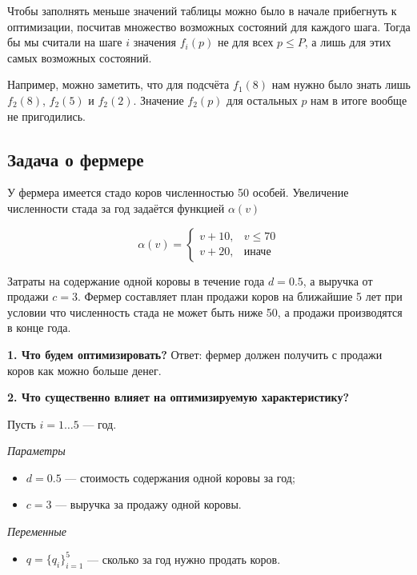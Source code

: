 \remark

Чтобы заполнять меньше значений таблицы можно было в начале прибегнуть к оптимизации, посчитав множество возможных состояний для каждого шага. Тогда бы мы считали на шаге $i$ значения $f_i(p)$ не для всех $p \le P$, а лишь для этих самых возможных состояний.

Например, можно заметить, что для подсчёта $f_1(8)$ нам нужно было знать лишь $f_2(8)$, $f_2(5)$ и $f_2(2)$. Значение $f_2(p)$ для остальных $p$ нам в итоге вообще не пригодились.

\subsection{Задача о фермере}

У фермера имеется стадо коров численностью 50 особей. Увеличение численности стада за год задаётся функцией $\alpha(v)$

\[
\alpha(v) = \begin{cases}
	v + 10,& v \le 70 \\
	v + 20,& \text{иначе}
\end{cases}
\]

Затраты на содержание одной коровы в течение года $d = 0.5$, а выручка от продажи $c = 3$. Фермер составляет план продажи коров на ближайшие 5 лет при условии что численность стада не может быть ниже 50, а продажи производятся в конце года.

\bigskip

\textbf{1. Что будем оптимизировать?} Ответ: фермер должен получить с продажи коров как можно больше денег.

\bigskip

\textbf{2. Что существенно влияет на оптимизируемую характеристику?}

Пусть $i = 1 \dots 5$ --- год.

\bigskip

\textit{Параметры}

\begin{itemize}[nosep]
	\item $d = 0.5$ --- стоимость содержания одной коровы за год;
	
	\item $c = 3$ --- выручка за продажу одной коровы.
\end{itemize}

\bigskip

\textit{Переменные}

\begin{itemize}[nosep]	
	\item $q = \{q_i\}_{i=1}^5$ --- сколько за год нужно продать коров.
\end{itemize}

